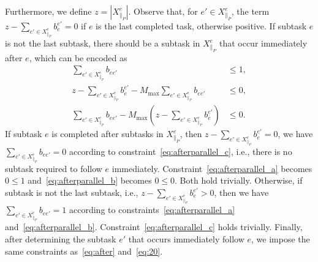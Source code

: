 \documentclass[Afour,sageh,times]{sagej}
\begin{document}
{{{{{ Furthermore, we define $z = |X^e_{\|_{P}}|$. Observe that, for $e' \in X^e_{\|_{P}} $, the term $z -  \sum_{e' \in X^e_{\|_{P}}  } b_{e}^{e'} = 0$ if $e$ is the last completed task, otherwise  positive. If subtask $e$ is not the last subtask, there should be a subtask in $X^e_{\|_{P}}$ that occur immediately after $e$, which can be encoded as
\begin{subequations}\label{eq:afterparallel}
  \begin{align}
  \sum_{e' \in X_{\|_P}^e} b_{ee'} & \le 1,\label{eq:afterparallel_a}\\
  z - \sum_{e' \in X^e_{\|_{P}}  } b_{e}^{e'} - M_{\text{max}}  \sum_{e' \in X_{\|_P}^e} b_{ee'} &  \leq 0, \label{eq:afterparallel_b} \\
  \sum_{e' \in X_{\|_P}^e} b_{ee'} - M_{\text{max}}(z -  \sum_{e' \in X^e_{\|_{P}}  } b_{e}^{e'}) & \leq0 . \label{eq:afterparallel_c}
\end{align}
\end{subequations}
If subtask $e$ is completed after  subtasks in  $X_{\|_P}^e$, then $z - \sum_{e' \in X^e_{\|_{P}}  } b_{e}^{e'} = 0$, we have $ \sum_{e' \in X_{\|_P}^e} b_{ee'}=0$ according to constraint~\eqref{eq:afterparallel_c}, i.e., there is no subtask required to follow $e$ immediately. Constraint~\eqref{eq:afterparallel_a} becomes $0\le 1$ and~\eqref{eq:afterparallel_b} becomes $0\le 0$. Both hold trivially.
Otherwise, if subtask is not the last subtask, i.e., $z - \sum_{e' \in X^e_{\|_{P}}  } b_{e}^{e'} > 0$, then we have $ \sum_{e' \in X_{\|_P}^e} b_{ee'}=1$ according to constraints~\eqref{eq:afterparallel_a} and~\eqref{eq:afterparallel_b}. Constraint~\eqref{eq:afterparallel_c} holds trivially. Finally, after determining the subtask $e'$ that occurs immediately follow $e$, we impose the same constraints as~\eqref{eq:after} and~\eqref{eq:20}.

}}}}}
\end{document}
